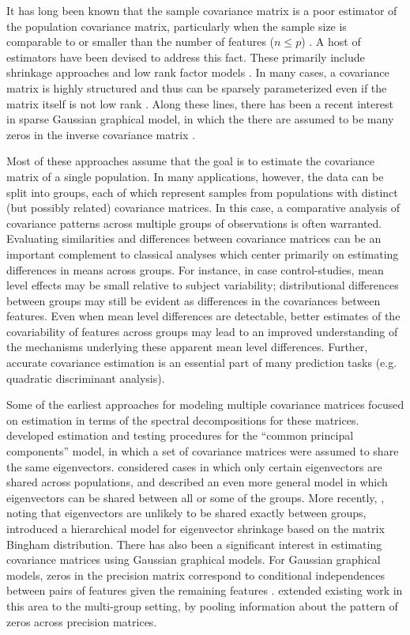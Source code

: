\documentclass[12pt]{article}
\begin{document}
It has long been known that the sample covariance matrix is a poor
estimator of the population covariance matrix, particularly when the
sample size is comparable to or smaller than the number of features
($n \leq p$) \citep{Dempster1969, Stein1975}.  A host of estimators
have been devised to address this fact. These primarily include
shrinkage approaches \citep{Schafer2005, Ledoit2011} and low
rank factor models \citep{Mardia1980, Ullman2003, Fan2008}.  In many
cases, a covariance matrix is highly structured and thus can be
sparsely parameterized even if the matrix itself is not low rank
\citep{Burg1982, Williams1993} .  Along these lines, there has been a
recent interest in sparse Gaussian graphical model, in which the there
are assumed to be many zeros in the inverse covariance matrix
\citep{Meinshausen2006, Friedman2008}.

Most of these approaches assume that the goal is to estimate the
covariance matrix of a single population.  In many applications,
however, the data can be split into groups, each of which represent
samples from populations with distinct (but possibly related)
covariance matrices.  In this case, a comparative analysis of
covariance patterns across multiple groups of observations is often
warranted.  Evaluating similarities and differences between covariance
matrices can be an important complement to classical analyses which
center primarily on estimating differences in means across groups.
For instance, in case control-studies, mean level effects may be small
relative to subject variability; distributional differences between
groups may still be evident as differences in the covariances between
features.  Even when mean level differences are detectable, better
estimates of the covariability of features across groups may lead to
an improved understanding of the mechanisms underlying these apparent
mean level differences.  Further, accurate covariance estimation is an
essential part of many prediction tasks (e.g. quadratic discriminant
analysis).

Some of the earliest approaches for modeling multiple
covariance matrices focused on estimation in terms of the spectral
decompositions for these matrices.  \cite{Flury1987} developed
estimation and testing procedures for the ``common principal
components'' model, in which a set of covariance matrices were assumed
to share the same eigenvectors.  \citet{Schott1991, Schott1999}
considered cases in which only certain eigenvectors are shared across
populations, and \citet{Boik2002} described an even more general model
in which eigenvectors can be shared between all or some of the groups.
More recently, \citet{Hoff2009}, noting that eigenvectors are unlikely
to be shared exactly between groups, introduced a hierarchical model
for eigenvector shrinkage based on the matrix Bingham distribution.
There has also been a significant interest in estimating covariance
matrices using Gaussian graphical models. For Gaussian graphical
models, zeros in the precision matrix correspond to conditional
independences between pairs of features given the remaining features
\citep{Meinshausen2006}.  \citet{Witten2014} extended existing work in
this area to the multi-group setting, by pooling information about the
pattern of zeros across precision matrices.
\end{document}

